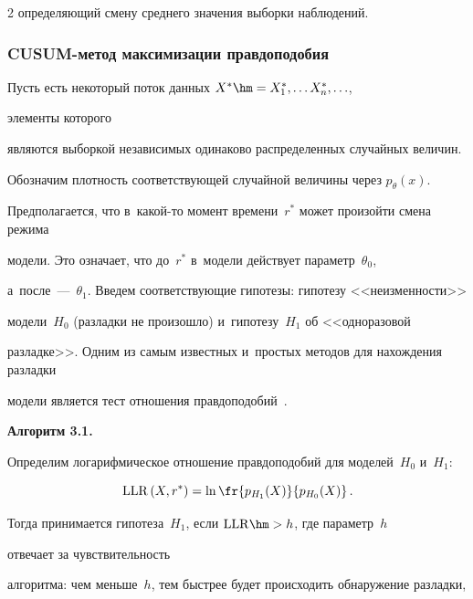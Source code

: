 \begin{multicols}{2}
определяющий смену среднего значения выборки наблюдений.





\subsubsection*{CUSUM-метод максимизации правдоподобия}





Пусть есть некоторый поток данных $X^* \hm= X^*_1,\ldots X^*_n,\ldots $, 


элементы которого 


являются выборкой независимых одинаково распределенных случайных величин. 


Обозначим плотность соответствующей случайной величины через $p_\theta(x).$ 


Предполагается, что в~ка\-кой-то момент времени~$r^*$ может произойти смена режима 


модели. Это означает, что до~$r^*$ в~модели действует параметр~$\theta_0$, 


а~после~---~$\theta_1$. Введем соответствующие гипотезы: гипотезу <<неизменности>> 


модели~$H_0$ (разладки не произошло) и~гипотезу~$H_1$ об <<одноразовой 


разладке>>. Одним из самым известных и~простых методов для нахождения разладки 


модели является тест отношения правдоподобий~\cite{kay}.





\noindent


\textbf{Алгоритм 3.1.}\ %


 Определим логарифмическое отношение правдоподобий для моделей~$H_0$ и~$H_1$: 


\begin{equation*}


\mathrm{LLR} \left(X, r^*\right) = 


\ln\fr{p_{H_1}(X)}{p_{H_0}(X)}\,.


\end{equation*} 


Тогда  принимается гипотеза~$H_1$, если $\mathrm{LLR} \hm>h$, где параметр~$h$  


отвечает за чувствительность 


алгоритма: чем меньше~$h$, тем быстрее будет происходить обнаружение разладки, 



\end{multicols}
